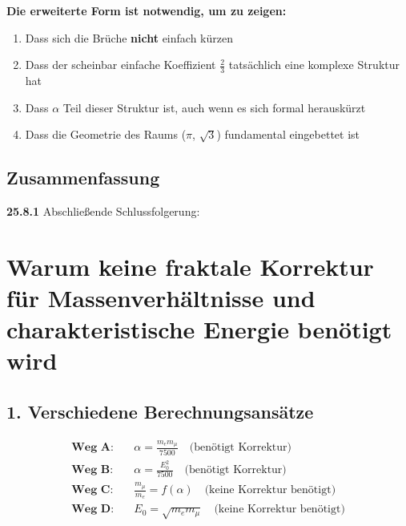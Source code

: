 \documentclass[12pt,a4paper]{article}
\begin{document}
\begin{tcolorbox}[colback=green!5!white,colframe=green!75!black]
	\textbf{Die erweiterte Form ist notwendig, um zu zeigen:}
	\begin{enumerate}
		\item Dass sich die Brüche \textbf{nicht} einfach kürzen
		\item Dass der scheinbar einfache Koeffizient $\frac{2}{3}$ tatsächlich eine komplexe Struktur hat
		\item Dass $\alpha$ Teil dieser Struktur ist, auch wenn es sich formal herauskürzt
		\item Dass die Geometrie des Raums ($\pi$, $\sqrt{3}$) fundamental eingebettet ist
	\end{enumerate}
\end{tcolorbox}

\subsection{Zusammenfassung}

\noindent \textbf{25.8.1} Abschließende Schlussfolgerung:
\begin{center}
\end{center}


\section{Warum keine fraktale Korrektur für Massenverhältnisse und charakteristische Energie benötigt wird}

\subsection{1. Verschiedene Berechnungsansätze}

\begin{align*}
	\textbf{Weg A:} &\quad \alpha = \frac{m_e m_\mu}{7500} \quad \text{(benötigt Korrektur)} \\
	\textbf{Weg B:} &\quad \alpha = \frac{E_0^2}{7500} \quad \text{(benötigt Korrektur)} \\
	\textbf{Weg C:} &\quad \frac{m_\mu}{m_e} = f(\alpha) \quad \text{(keine Korrektur benötigt)} \\
	\textbf{Weg D:} &\quad E_0 = \sqrt{m_e m_\mu} \quad \text{(keine Korrektur benötigt)}
\end{align*}
\end{document}
